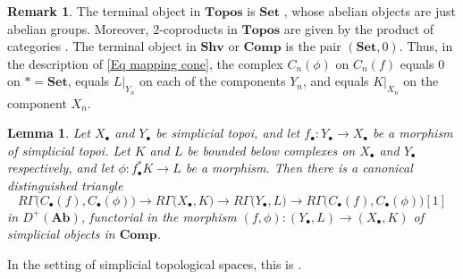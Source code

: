 \documentclass[11pt]{amsart}
\newtheorem{Lemma}[Thm]{Lemma}
\theoremstyle{definition}
\newtheorem{Rmk}[Thm]{Remark}
\newcommand{\Ab}{\mathbf{Ab}}
\newcommand{\Set}{\mathbf{Set}}
\newcommand{\Topos}{\mathbf{Topos}}
\newcommand{\SHV}{\mathbf{Shv}}
\newcommand{\COMP}{\mathbf{Comp}}
\begin{document}
\begin{Rmk}\label{Rmk terminal site}
The terminal object in $\Topos$ is $\Set$ \cite[exp.~IV,~\S
4.3]{SGA4I}, whose abelian objects are just abelian groups.
Moreover, $2$-coproducts in $\Topos$ are given by the product of
categories \cite[exp.~IV, exercice~8.7(bc)]{SGA4I}. The terminal object
in $\SHV$ or $\COMP$ is the pair $(\Set,0)$.
Thus, in the description of \eqref{Eq mapping cone}, the complex
$C_n(\phi)$ on $C_n(f)$ equals $0$ on $* = \Set$, equals $L|_{Y_n}$
on each of the components $Y_n$, and equals $K|_{X_n}$ on the
component $X_n$.
\end{Rmk}

\begin{Lemma}\label{Lem distinguished triangle}
Let $X_\bullet$ and $Y_\bullet$ be simplicial topoi, and let
$f_\bullet \colon Y_\bullet \to X_\bullet$ be a morphism of
simplicial topoi. Let $K$ and $L$ be bounded below complexes on
$X_\bullet$ and $Y_\bullet$ respectively, and let $\phi \colon
f_\bullet^* K \to L$ be a morphism. Then there is a canonical
distinguished triangle
\begin{equation*}
R\Gamma\big(C_\bullet(f),C_\bullet(\phi)\big) \to
R\Gamma\big(X_\bullet,K\big) \to R\Gamma\big(Y_\bullet,L\big) \to
R\Gamma\big(C_\bullet(f),C_\bullet(\phi)\big)[1]
\end{equation*}
in $D^+(\Ab)$, functorial in the morphism $(f,\phi) \colon
(Y_\bullet,L) \to (X_\bullet,K)$ of simplicial objects in $\COMP$.
\end{Lemma}

In the setting of simplicial topological spaces, this is
\cite[6.3.3]{Hdg3}.
\end{document}
